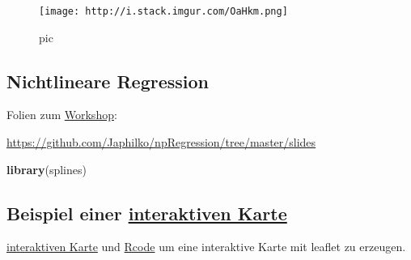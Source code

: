 \documentclass[]{article}
\newenvironment{Shaded}{\begin{snugshade}}{\end{snugshade}}
\newcommand{\KeywordTok}[1]{\textcolor[rgb]{0.13,0.29,0.53}{\textbf{{#1}}}}
\newcommand{\NormalTok}[1]{{#1}}
\begin{document}
\begin{figure}[htbp]
\centering
\texttt{[image: http://i.stack.imgur.com/OaHkm.png]}
\caption{pic}
\end{figure}

\subsection{Nichtlineare Regression}\label{nichtlineare-regression}

Folien zum
\href{https://github.com/Japhilko/npRegression/tree/master/slides}{Workshop}:

\url{https://github.com/Japhilko/npRegression/tree/master/slides}

\begin{Shaded}
\begin{Highlighting}[]
\KeywordTok{library}\NormalTok{(splines)}
\end{Highlighting}
\end{Shaded}

\subsection{\texorpdfstring{Beispiel einer
\href{http://rpubs.com/Japhilko82/Campsites}{interaktiven
Karte}}{Beispiel einer interaktiven Karte}}\label{beispiel-einer-interaktiven-karte}

\href{http://rpubs.com/Japhilko82/Campsites}{interaktiven Karte} und
\href{https://raw.githubusercontent.com/Japhilko/GeoData/master/2015/rcode/SpatMA_Interactive\%20maps.R}{Rcode}
um eine interaktive Karte mit leaflet zu erzeugen.
\end{document}
